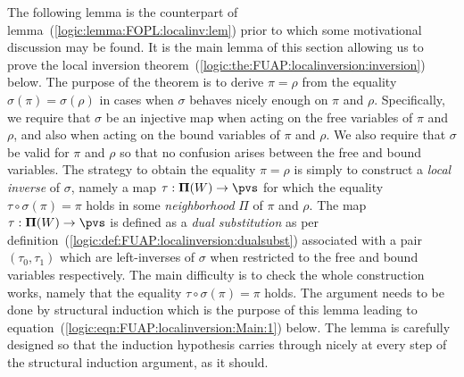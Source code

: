 The following lemma is the counterpart of
lemma~(\ref{logic:lemma:FOPL:localinv:lem}) prior to which some
motivational discussion may be found. It is the main lemma of this
section allowing us to prove the local inversion
theorem~(\ref{logic:the:FUAP:localinversion:inversion}) below. The
purpose of the theorem is to derive $\pi=\rho$ from the equality
$\sigma(\pi)=\sigma(\rho)$ in cases when $\sigma$ behaves nicely
enough on $\pi$ and $\rho$. Specifically, we require that $\sigma$
be an injective map when acting on the free variables of $\pi$ and
$\rho$, and also when acting on the bound variables of $\pi$ and
$\rho$. We also require that $\sigma$ be valid for $\pi$ and $\rho$
so that no confusion arises between the free and bound variables.
The strategy to obtain the equality $\pi=\rho$ is simply to
construct a {\em local inverse} of $\sigma$, namely a map
$\tau:{\bf\Pi}(W)\to\pvs$ for which the equality
$\tau\circ\sigma(\pi)=\pi$ holds in some {\em neighborhood} $\Pi$ of
$\pi$ and $\rho$. The map $\tau:{\bf\Pi}(W)\to\pvs$ is defined as a
{\em dual substitution} as per
definition~(\ref{logic:def:FUAP:localinversion:dualsubst})
associated with a pair $(\tau_{0},\tau_{1})$ which are left-inverses
of $\sigma$ when restricted to the free and bound variables
respectively. The main difficulty is to check the whole construction
works, namely that the equality $\tau\circ\sigma(\pi)=\pi$ holds.
The argument needs to be done by structural induction which is the
purpose of this lemma leading to
equation~(\ref{logic:eqn:FUAP:localinversion:Main:1}) below. The
lemma is carefully designed so that the induction hypothesis carries
through nicely at every step of the structural induction argument,
as it should.

